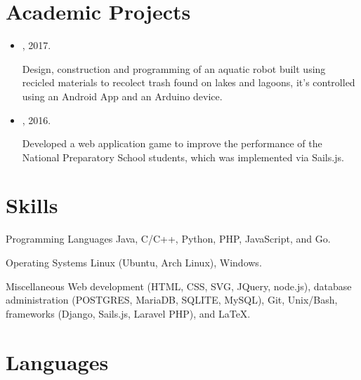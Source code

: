 \documentclass{curriculum-vitae}
\begin{document}
  \section{Academic Projects}

    \begin{itemize}
      \item {}, 2017.

        Design, construction and programming of an aquatic robot built using
        recicled materials to recolect trash found on lakes and lagoons, it's
        controlled using an Android App and an Arduino device.

      \item {}, 2016.

        Developed a web application game to improve the performance of the
        National Preparatory School students, which was implemented via
        Sails.js.

    \end{itemize}

  \section{Skills}

    \skill%
      {Programming Languages}
      {Java, C/C++, Python, PHP, JavaScript, and Go.}

    \vspace{0.5em}

    \skill%
      {Operating Systems}
      {Linux (Ubuntu, Arch Linux), Windows.}

    \vspace{0.5em}

    \skill%
      {Miscellaneous}
      {Web development (HTML, CSS, SVG, JQuery, node.js), database
        administration (POSTGRES, MariaDB, SQLITE, MySQL), Git, Unix/Bash,
        frameworks (Django, Sails.js, Laravel PHP), and \LaTeX.}

  \section{Languages}
\end{document}

